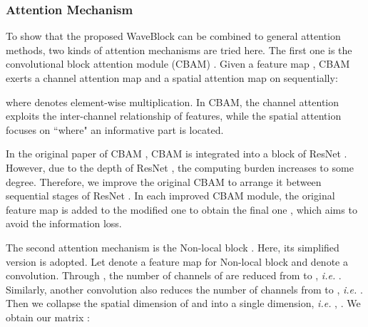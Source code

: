 \documentclass[journal]{IEEEtran}
\begin{document}
\subsubsection{Attention Mechanism}
To show that the proposed WaveBlock can be combined to general attention methods, two kinds of attention mechanisms are tried here. The first one is the convolutional block attention module (CBAM) \cite{woo2018cbam}. Given a feature map , CBAM exerts a channel attention map  and a spatial attention map  on  sequentially:


where  denotes element-wise multiplication. In CBAM, the channel attention exploits the inter-channel relationship of features, while the spatial attention focuses on ``where" an informative part is located.  \par 
In the original paper of CBAM \cite{woo2018cbam}, CBAM is integrated into a block of ResNet \cite{he2016deep}. However, due to the depth of ResNet \cite{he2016deep}, the computing burden increases to some degree. Therefore, we improve the original CBAM to arrange it between sequential stages of ResNet \cite{he2016deep}. In each improved CBAM module, the original feature map  is added to the modified one  to obtain the final one , which aims to avoid the information loss. \par 
\begin{comment}
The design of the original CBAM and the improved one are shown in Fig \ref{CBAM}. 
\begin{figure}[t] 
\centering    

\subfigure[Original CBAM] 
{	
	\begin{minipage}{8cm}
	\centering
	\texttt{[image: CBAM\_old.pdf]}  
	
	\end{minipage}
}
\subfigure[Improved CBAM] 
{
	\begin{minipage}{8cm}
	\centering
	\texttt{[image: CBAM\_new.pdf]}   
	\end{minipage}
}
\caption{The original CBAM and improved CBAM. The original CBAM is integrated with each block while the improved CBAM is arranged between sequential stages. When added CBAM into backbone, the improved CBAM has much less parameters than the original one.}
\label{CBAM}
\end{figure}
\end{comment}
The second attention mechanism is the Non-local block \cite{wang2018non}. Here, its simplified version is adopted. Let  denote a feature map for Non-local block and  denote a  convolution. Through , the number of channels of  are reduced from  to , \textit{i.e.} . Similarly, another  convolution  also reduces the number of channels from  to , \textit{i.e.} . Then we collapse the spatial dimension of  and  into a single dimension, \textit{i.e.} , . We obtain our matrix :
\end{document}
